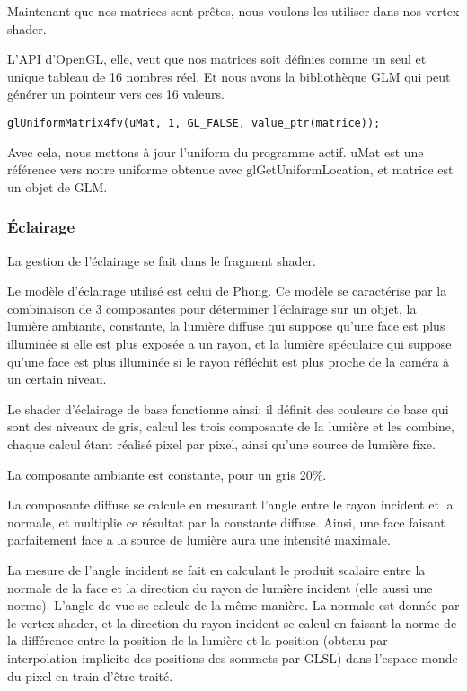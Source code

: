 \documentclass[pdftex, 11pt, a4paper, titlepage]{article}
\begin{document}
Maintenant que nos matrices sont prêtes, nous voulons les utiliser
dans nos vertex shader.

L'API d'OpenGL, elle, veut que nos matrices soit définies comme
un seul et unique tableau de 16 nombres réel. Et nous avons la
bibliothèque GLM qui peut générer un pointeur vers ces 16 valeurs.

\begin{lstlisting}
glUniformMatrix4fv(uMat, 1, GL_FALSE, value_ptr(matrice));
\end{lstlisting}

Avec cela, nous mettons à jour l'uniform du programme actif.
uMat est une référence vers notre uniforme obtenue avec glGetUniformLocation,
et matrice est un objet de GLM.

\subsubsection{Éclairage}

La gestion de l'éclairage se fait dans le fragment shader.

Le modèle d'éclairage utilisé est celui de Phong. Ce modèle se caractérise par
la combinaison de 3 composantes pour déterminer l'éclairage sur un objet,
la lumière ambiante, constante, la lumière diffuse qui suppose qu'une face
est plus illuminée si elle est plus exposée a un rayon, et la lumière 
spéculaire qui suppose qu'une face est plus illuminée si le rayon réfléchit
 est plus proche de la caméra à un certain niveau.

Le shader d'éclairage de base fonctionne ainsi: il définit des couleurs de
 base qui sont des niveaux de gris, calcul les trois composante de la lumière
 et les combine, chaque calcul étant réalisé pixel par pixel, 
ainsi qu'une source de lumière fixe.

La composante ambiante est constante, pour un gris 20\%.

La composante diffuse se calcule en mesurant l'angle entre le rayon incident
 et la normale, et multiplie ce résultat par la constante diffuse. 
Ainsi, une face faisant parfaitement face a la source de lumière aura
 une intensité maximale.

La mesure de l'angle incident se fait en calculant le produit scalaire 
entre la normale de la face et la direction du rayon de lumière incident
(elle aussi une norme). L'angle de vue se calcule de la même manière.
La normale est donnée par le vertex shader, et la direction du rayon incident
 se calcul en faisant la norme de la différence entre la position de la
 lumière et la position (obtenu par interpolation implicite des positions des
 sommets par GLSL) dans l'espace monde du pixel en train d'être traité.
\end{document}
